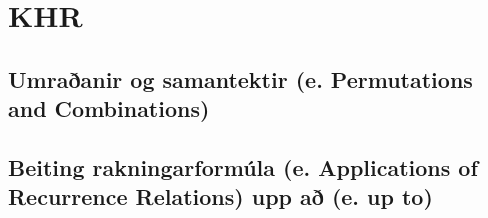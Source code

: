 \section{KHR}

\subsection{Umraðanir og samantektir (e. Permutations and Combinations)}


\setcounter{section}{8}
\setcounter{subsection}{0}
\subsection{Beiting rakningarformúla  (e. Applications of Recurrence Relations) upp að (e. up to)}

\newpage